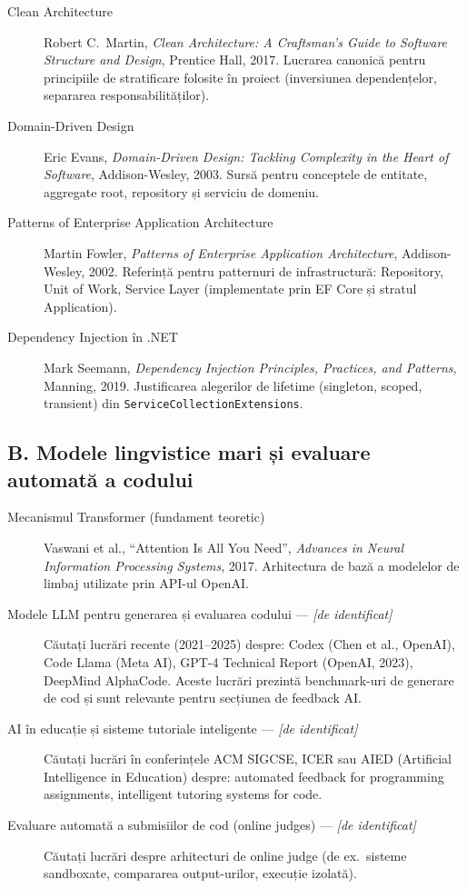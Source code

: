 \begin{description}
  \item[Clean Architecture]
    Robert C.\ Martin, \emph{Clean Architecture: A Craftsman's Guide to
    Software Structure and Design}, Prentice Hall, 2017.
    Lucrarea canonică pentru principiile de stratificare folosite în
    proiect (inversiunea dependențelor, separarea responsabilităților).

  \item[Domain-Driven Design]
    Eric Evans, \emph{Domain-Driven Design: Tackling Complexity in the
    Heart of Software}, Addison-Wesley, 2003.
    Sursă pentru conceptele de entitate, aggregate root, repository și
    serviciu de domeniu.

  \item[Patterns of Enterprise Application Architecture]
    Martin Fowler, \emph{Patterns of Enterprise Application Architecture},
    Addison-Wesley, 2002.
    Referință pentru patternuri de infrastructură: Repository, Unit of Work,
    Service Layer (implementate prin EF Core și stratul Application).

  \item[Dependency Injection în .NET]
    Mark Seemann, \emph{Dependency Injection Principles, Practices, and
    Patterns}, Manning, 2019.
    Justificarea alegerilor de lifetime (singleton, scoped, transient) din
    \texttt{ServiceCollectionExtensions}.
\end{description}

\subsection*{B. Modele lingvistice mari și evaluare automată a codului}

\begin{description}
  \item[Mecanismul Transformer (fundament teoretic)]
    Vaswani et al., ``Attention Is All You Need'',
    \emph{Advances in Neural Information Processing Systems}, 2017.
    Arhitectura de bază a modelelor de limbaj utilizate prin API-ul OpenAI.

  \item[Modele LLM pentru generarea și evaluarea codului — \emph{[de identificat]}]
    Căutați lucrări recente (2021--2025) despre: Codex (Chen et al., OpenAI),
    Code Llama (Meta AI), GPT-4 Technical Report (OpenAI, 2023),
    DeepMind AlphaCode.
    Aceste lucrări prezintă benchmark-uri de generare de cod și sunt
    relevante pentru secțiunea de feedback AI.

  \item[AI în educație și sisteme tutoriale inteligente — \emph{[de identificat]}]
    Căutați lucrări în conferințele ACM SIGCSE, ICER sau AIED (Artificial
    Intelligence in Education) despre: automated feedback for programming
    assignments, intelligent tutoring systems for code.

  \item[Evaluare automată a submisiilor de cod (online judges) — \emph{[de identificat]}]
    Căutați lucrări despre arhitecturi de online judge
    (de ex.\ sisteme sandboxate, compararea output-urilor, execuție izolată).
\end{description}

